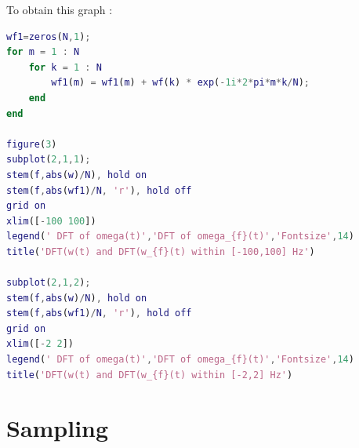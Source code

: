 \documentclass[a4paper,12pt]{article}
\begin{document}
\begin{enumerate}[label={\color{blue}\arabic*)}]
    \newpage
    To obtain this graph :

    \begin{lstlisting}[style=Matlab-editor,language=Matlab, basicstyle=\small\ttfamily]
wf1=zeros(N,1);
for m = 1 : N
    for k = 1 : N
        wf1(m) = wf1(m) + wf(k) * exp(-1i*2*pi*m*k/N);
    end
end

figure(3)
subplot(2,1,1);
stem(f,abs(w)/N), hold on
stem(f,abs(wf1)/N, 'r'), hold off
grid on
xlim([-100 100])
legend(' DFT of omega(t)','DFT of omega_{f}(t)','Fontsize',14)
title('DFT(w(t) and DFT(w_{f}(t) within [-100,100] Hz')

subplot(2,1,2);
stem(f,abs(w)/N), hold on
stem(f,abs(wf1)/N, 'r'), hold off
grid on
xlim([-2 2])
legend(' DFT of omega(t)','DFT of omega_{f}(t)','Fontsize',14)
title('DFT(w(t) and DFT(w_{f}(t) within [-2,2] Hz')
    \end{lstlisting}

\end{enumerate}

\newpage
\section{Sampling}
\end{document}
